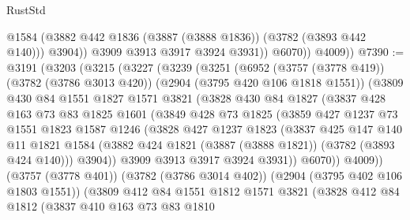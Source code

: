 \begin{lexlean}{RustStd}
\begin{coremodule}
                    @1584
                    (@3882 @442 @1836 (@3887 (@3888 @1836)) (@3782 (@3893 @442 @140)))
                    @3904))
                @3909
                @3913
                @3917
                @3924
                @3931))
            @6070))
        @4009))
@7390 := @3191
    (@3203
      (@3215
        (@3227
          (@3239
            (@3251
              (@6952
                (@3757 (@3778 @419))
                (@3782 (@3786 @3013 @420))
                (@2904 (@3795 @420 @106 @1818 @1551))
                (@3809
                  @430
                  @84
                  @1551
                  @1827
                  @1571
                  @3821
                  (@3828
                    @430
                    @84
                    @1827
                    (@3837
                      @428
                      @163
                      @73
                      @83
                      @1825
                      @1601
                      (@3849
                        @428
                        @73
                        @1825
                        (@3859
                          @427
                          @1237
                          @73
                          @1551
                          @1823
                          @1587
                          @1246
                          (@3828
                            @427
                            @1237
                            @1823
                            (@3837
                              @425
                              @147
                              @140
                              @11
                              @1821
                              @1584
                              (@3882 @424 @1821 (@3887 (@3888 @1821)) (@3782 (@3893 @424 @140)))
                              @3904))
                          @3909
                          @3913
                          @3917
                          @3924
                          @3931))
                      @6070))
                  @4009))
              (@3757 (@3778 @401))
              (@3782 (@3786 @3014 @402))
              (@2904 (@3795 @402 @106 @1803 @1551))
              (@3809
                @412
                @84
                @1551
                @1812
                @1571
                @3821
                (@3828
                  @412
                  @84
                  @1812
                  (@3837
                    @410
                    @163
                    @73
                    @83
                    @1810

\end{coremodule}
\end{lexlean}
